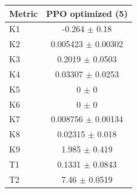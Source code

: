 \begin{tabular}{lc}
\toprule
Metric & PPO optimized (5) \\
\midrule
K1 & -0.264 $\pm$ 0.18 \\
K2 & 0.005423 $\pm$ 0.00302 \\
K3 & 0.2019 $\pm$ 0.0503 \\
K4 & 0.03307 $\pm$ 0.0253 \\
K5 & 0 $\pm$ 0 \\
K6 & 0 $\pm$ 0 \\
K7 & 0.008756 $\pm$ 0.00134 \\
K8 & 0.02315 $\pm$ 0.018 \\
K9 & 1.985 $\pm$ 0.419 \\
T1 & 0.1331 $\pm$ 0.0843 \\
T2 & 7.46 $\pm$ 0.0519 \\
\bottomrule
\end{tabular}
